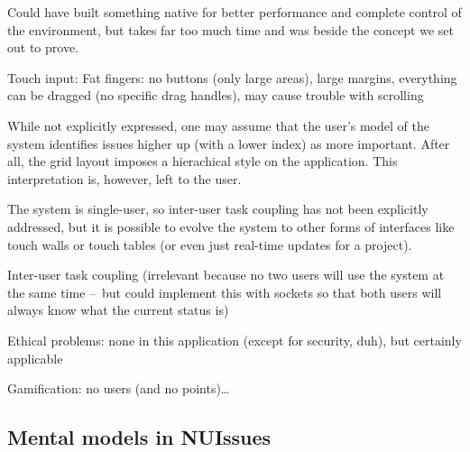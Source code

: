 Could have built something native for better performance and complete control of the environment, but takes far too much time and was beside the concept we set out to prove.

Touch input: Fat fingers: no buttons (only large areas), large margins, everything can be dragged (no specific drag handles), may cause trouble with scrolling

While not explicitly expressed, one may assume that the user's model of the system identifies issues higher up (with a lower index) as more important. After all, the grid layout imposes a hierachical style on the application. This interpretation is, however, left to the user.

The system is single-user, so inter-user task coupling has not been explicitly addressed, but it is possible to evolve the system to other forms of interfaces like touch walls or touch tables (or even just real-time updates for a project).

Inter-user task coupling (irrelevant because no two users will use the system at the same time – but could implement this with sockets so that both users will always know what the current status is)





Ethical problems: none in this application (except for security, duh), but certainly applicable %

Gamification: no users (and no points)\dots %

\subsection{Mental models in NUIssues}

